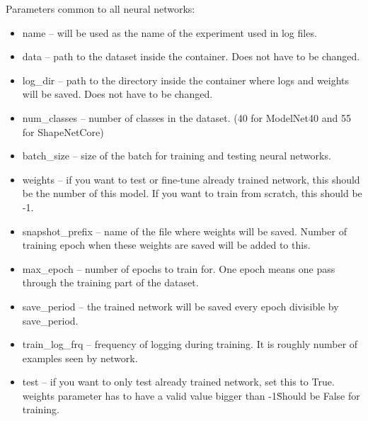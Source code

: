 Parameters common to all neural networks:
\begin{itemize}
	\item{name -- will be used as the name of the experiment used in log files.}
	\item{data -- path to the dataset inside the container. Does not have to be changed.}
	\item{log\_dir -- path to the directory inside the container where logs and weights will be saved. Does not have to be changed.}
	\item{num\_classes -- number of classes in the dataset. (40 for ModelNet40 and 55 for ShapeNetCore)}
	\item{batch\_size -- size of the batch for training and testing neural networks.}
	\item{weights -- if you want to test or fine-tune already trained network, this should be the number of this model. If you want to train from scratch, this should be -1.}
	\item{snapshot\_prefix -- name of the file where weights will be saved. Number of training epoch when these weights are saved will be added to this.}
	\item{max\_epoch -- number of epochs to train for. One epoch means one pass through the training part of the dataset.}
	\item{save\_period -- the trained network will be saved every epoch divisible by save\_period.}
	\item{train\_log\_frq -- frequency of logging during training. It is roughly number of examples seen by network.}
	\item{test -- if you want to only test already trained network, set this to True. weights parameter has to have a valid value bigger than -1\. Should be False for training.}
\end{itemize}
